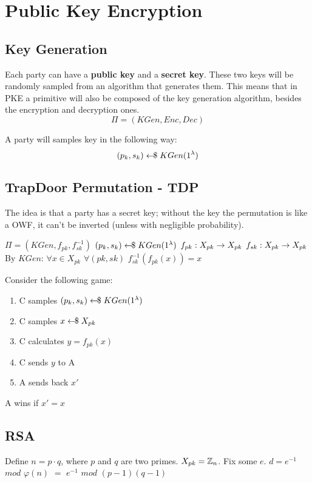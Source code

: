 \chapter{Public Key Encryption}

\section{Key Generation}
Each party can have a \textbf{public key} and a \textbf{secret key}. These two keys will be randomly sampled from an algorithm that generates them. This means that in PKE a primitive will also be composed of the key generation algorithm, besides the encryption and decryption ones.
\[ \Pi = (KGen, Enc, Dec) \]

A party will samples key in the following way:
\[ (p_k,s_k) \leftarrow\kern-0.42em{\$} \; KGen(1^\lambda) \]


\section{TrapDoor Permutation - TDP}
The idea is that a party has a secret key; without the key the permutation is like a OWF, it can't be inverted (unless with negligible probability).

$\Pi = (KGen, f_{pk}, f_{sk}^{-1})$\newline
$(p_k,s_k) \leftarrow\kern-0.42em{\$} \; KGen(1^\lambda)$\newline
$f_{pk} : X_{pk} \rightarrow X_{pk}$\newline
$f_{sk} : X_{pk} \rightarrow X_{pk}$\newline
By $KGen$: $\forall x \in X_{pk}$ $\forall (pk,sk)$ $f_{sk}^{-1}(f_{pk}(x)) = x$

Consider the following game:
\begin{enumerate}
    \item C samples $(p_k,s_k) \leftarrow\kern-0.42em{\$} \; KGen(1^\lambda)$
    \item C samples $x \leftarrow\kern-0.42em{\$} \; X_{pk}$
    \item C calculates $y = f_{pk}(x)$
    \item C sends $y$ to A
    \item A sends back $x'$
\end{enumerate}
A wins if $x' = x$


\section{RSA}
Define $n = p \cdot q$, where $p$ and $q$ are two primes. $X_{pk} = \mathbb{Z}_n$.\newline
Fix some $e$. $d = e^{-1}$ $mod$ $\varphi(n)$ $=$ $e^{-1}$ $mod$ $(p-1)(q-1)$

